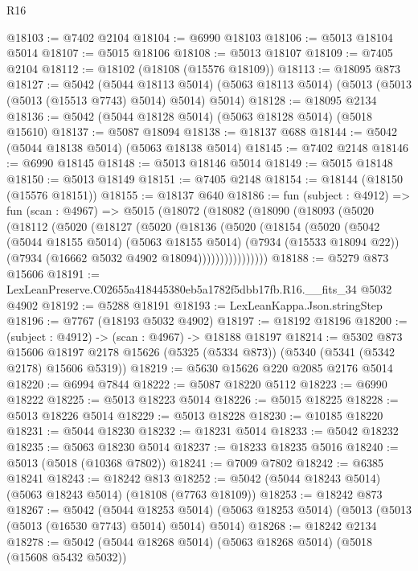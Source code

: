 \begin{lexlean}{R16}
\begin{coremodule}
@18103 := @7402 @2104
@18104 := @6990 @18103
@18106 := @5013 @18104 @5014
@18107 := @5015 @18106
@18108 := @5013 @18107
@18109 := @7405 @2104
@18112 := @18102 (@18108 (@15576 @18109))
@18113 := @18095 @873
@18127 := @5042
    (@5044 @18113 @5014)
    (@5063 @18113 @5014)
    (@5013 (@5013 (@5013 (@15513 @7743) @5014) @5014) @5014)
@18128 := @18095 @2134
@18136 := @5042 (@5044 @18128 @5014) (@5063 @18128 @5014) (@5018 @15610)
@18137 := @5087 @18094
@18138 := @18137 @688
@18144 := @5042 (@5044 @18138 @5014) (@5063 @18138 @5014)
@18145 := @7402 @2148
@18146 := @6990 @18145
@18148 := @5013 @18146 @5014
@18149 := @5015 @18148
@18150 := @5013 @18149
@18151 := @7405 @2148
@18154 := @18144 (@18150 (@15576 @18151))
@18155 := @18137 @640
@18186 := fun (subject : @4912) =>
  fun (scan : @4967) =>
  @5015
    (@18072
      (@18082
        (@18090
          (@18093
            (@5020
              (@18112
                (@5020
                  (@18127
                    (@5020
                      (@18136
                        (@5020
                          (@18154
                            (@5020
                              (@5042
                                (@5044 @18155 @5014)
                                (@5063 @18155 @5014)
                                (@7934 (@15533 @18094 @22))
                                (@7934 (@16662 @5032 @4902 @18094))))))))))))))))
@18188 := @5279 @873 @15606
@18191 := LexLeanPreserve.C02655a418445380eb5a1782f5dbb17fb.R16.__fits_34 @5032 @4902
@18192 := @5288 @18191
@18193 := LexLeanKappa.Json.stringStep
@18196 := @7767 (@18193 @5032 @4902)
@18197 := @18192 @18196
@18200 := (subject : @4912) -> (scan : @4967) -> @18188 @18197
@18214 := @5302
    @873
    @15606
    @18197
    @2178
    @15626
    (@5325 (@5334 @873))
    (@5340 (@5341 (@5342 @2178) @15606 @5319))
@18219 := @5630 @15626 @220 @2085 @2176 @5014
@18220 := @6994 @7844
@18222 := @5087 @18220 @5112
@18223 := @6990 @18222
@18225 := @5013 @18223 @5014
@18226 := @5015 @18225
@18228 := @5013 @18226 @5014
@18229 := @5013 @18228
@18230 := @10185 @18220
@18231 := @5044 @18230
@18232 := @18231 @5014
@18233 := @5042 @18232
@18235 := @5063 @18230 @5014
@18237 := @18233 @18235 @5016
@18240 := @5013 (@5018 (@10368 @7802))
@18241 := @7009 @7802
@18242 := @6385 @18241
@18243 := @18242 @813
@18252 := @5042 (@5044 @18243 @5014) (@5063 @18243 @5014) (@18108 (@7763 @18109))
@18253 := @18242 @873
@18267 := @5042
    (@5044 @18253 @5014)
    (@5063 @18253 @5014)
    (@5013 (@5013 (@5013 (@16530 @7743) @5014) @5014) @5014)
@18268 := @18242 @2134
@18278 := @5042 (@5044 @18268 @5014) (@5063 @18268 @5014) (@5018 (@15608 @5432 @5032))

\end{coremodule}
\end{lexlean}
